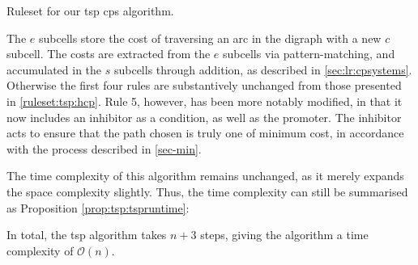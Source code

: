 \begin{cprulesetfloat}
    \begin{cpruleset}
        
        
        
        
        
        
    \end{cpruleset}
    \caption[Ruleset for the ]{\label{ruleset:tsp:tsp}Ruleset for our \gls{tsp} \gls{cps} algorithm.}
\end{cprulesetfloat}

The \(e\) subcells store the cost of traversing an arc in the digraph with a new \(c\) subcell.  The costs are extracted from the \(e\) subcells via pattern-matching, and accumulated in the \(s\) subcells through addition, as described in \cref{sec:lr:cpsystems}. Otherwise the first four rules are substantively unchanged from those presented in \cref{ruleset:tsp:hcp}.  Rule 5, however, has been more notably modified, in that it now includes an inhibitor as a condition, as well as the promoter.  The inhibitor acts to ensure that the path chosen is truly one of minimum cost, in accordance with the process described in \cref{sec-min}.

The time complexity of this algorithm remains unchanged, as it merely expands the space complexity slightly.  Thus, the time complexity can still be summarised as Proposition \ref{prop:tsp:tspruntime}:

\begin{proposition}
In total, the \gls{tsp} algorithm takes \(n + 3\) steps, giving the algorithm a time complexity of \(\mathcal{O}(n)\).
\label{prop:tsp:tspruntime}
\end{proposition}